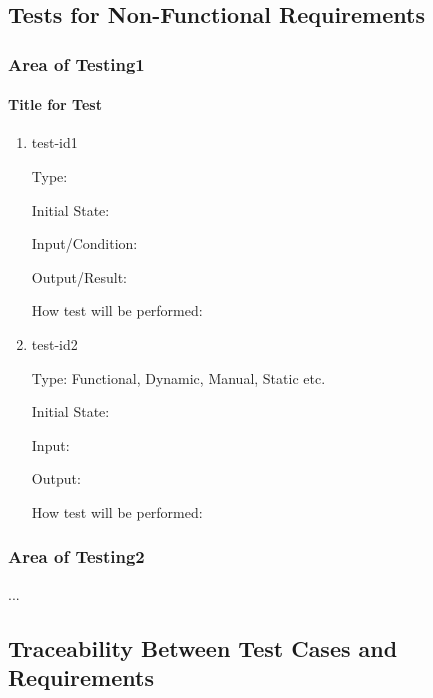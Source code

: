 \documentclass[12pt, titlepage]{article}
\begin{document}
\subsection{Tests for Non-Functional Requirements}

\subsubsection{Area of Testing1}
		
\paragraph{Title for Test}

\begin{enumerate}

\item{test-id1\\}

Type: 
					
Initial State: 
					
Input/Condition: 
					
Output/Result: 
					
How test will be performed: 
					
\item{test-id2\\}

Type: Functional, Dynamic, Manual, Static etc.
					
Initial State: 
					
Input: 
					
Output: 
					
How test will be performed: 

\end{enumerate}

\subsubsection{Area of Testing2}

...

\subsection{Traceability Between Test Cases and Requirements}

\end{document}

